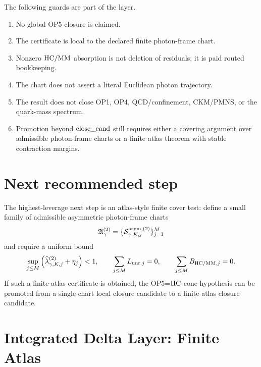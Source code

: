 The following guards are part of the layer.
\begin{enumerate}
 \item No global OP5 closure is claimed.
 \item The certificate is local to the declared finite photon-frame chart.
 \item Nonzero \(\HC/\MM\) absorption is not deletion of residuals; it is paid routed bookkeeping.
 \item The chart does not assert a literal Euclidean photon trajectory.
 \item The result does not close OP1, OP4, QCD/confinement, CKM/PMNS, or the quark-mass spectrum.
 \item Promotion beyond \(\closecand\) still requires either a covering argument over admissible photon-frame charts or a finite atlas theorem with stable contraction margins.
\end{enumerate}

\section{Next recommended step}

The highest-leverage next step is an atlas-style finite cover test: define a small family of admissible asymmetric photon-frame charts
\[
\mathfrak A_{\gamma}^{(2)}=
\{\mathcal S_{\gamma,K,j}^{\asym,(2)}\}_{j=1}^{M}
\]
and require a uniform bound
\[
\sup_{j\le M}\left(
\widehat\lambda_{\gamma,K,j}^{(2)}+\eta_j\right)<1,
\qquad
\sum_{j\le M}L_{\unr,j}=0,
\qquad
\sum_{j\le M}B_{\HC/\MM,j}=0.
\]
If such a finite-atlas certificate is obtained, the OP5=\(\HC\)-cone hypothesis can be promoted from a single-chart local closure candidate to a finite-atlas closure candidate.



\clearpage
\section*{Integrated Delta Layer: Finite Atlas}
\providecommand{\HC}{}
\renewcommand{\HC}{\mathrm{HC}}
\providecommand{\MM}{}
\renewcommand{\MM}{\mathrm{MM}}
\providecommand{\OP}{}
\renewcommand{\OP}{\mathrm{OP}}
\providecommand{\rout}{}
\renewcommand{\rout}{\mathrm{rout}}
\providecommand{\unr}{}
\renewcommand{\unr}{\mathrm{unr}}
\providecommand{\asym}{}
\renewcommand{\asym}{\mathrm{asym}}
\providecommand{\Atlas}{}
\renewcommand{\Atlas}{\mathfrak A}
\providecommand{\closecand}{}
\renewcommand{\closecand}{\mathrm{close\_cand}}
\providecommand{\atlascand}{}
\renewcommand{\atlascand}{\mathrm{atlas\_close\_cand}}
\providecommand{\certred}{}
\renewcommand{\certred}{\mathrm{cert\_red}}
\providecommand{\certcomp}{}
\renewcommand{\certcomp}{\mathrm{cert\_comp}}
\providecommand{\resproj}{}
\renewcommand{\resproj}{\mathrm{res\_proj}}
\providecommand{\ConeObs}{}
\renewcommand{\ConeObs}{D_{\OP5=\HC\text{-}\mathrm{cone}}}



